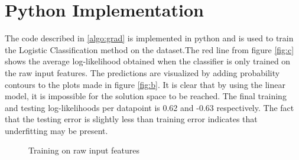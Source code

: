 \documentclass[journal]{IEEEtran}
\begin{document}
\section{Python Implementation}
The code described in \ref{algo:grad} is implemented in python and is used to train the Logistic Classification method on the dataset.The red line from figure \ref{fig:c} shows the average log-likelihood obtained when the classifier is only trained on the raw input features. The predictions are visualized by adding probability contours to the plots made in figure \ref{fig:b}. It is clear that by using the linear model, it is impossible for the solution space to be reached. The final training and testing log-likelihoods per datapoint is 0.62 and -0.63 respectively. The fact that the testing error is slightly less than training error indicates that underfitting may be present. \\
\begin{figure}[htbp]
\centering     %
{}
\caption{Training on raw input features}
\end{figure}
\end{document}
